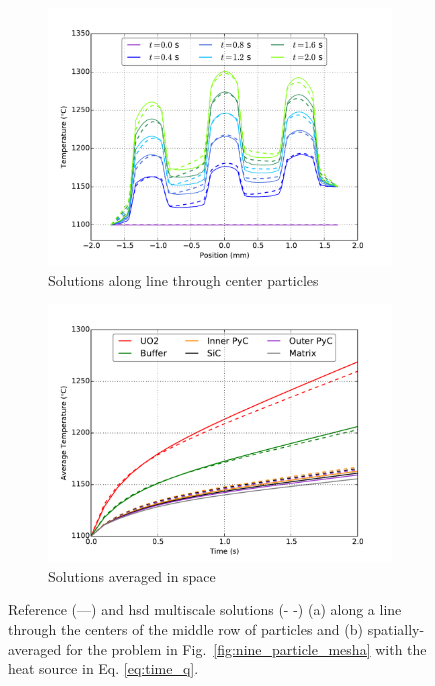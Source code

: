 \begin{figure}[!h]
\centering
\begin{subfigure}[b]{0.49\linewidth}
\centering
\includegraphics[width=1.1\linewidth]{figs/nine_particle_center_row_transient.png}
\caption{Solutions along line through center particles}
\label{fig:time_q}
\end{subfigure}
\begin{subfigure}[b]{0.49\linewidth}
\centering
\includegraphics[width=1.1\linewidth]{figs/nine_particle_transient_postprocessors.png}
\caption{Solutions averaged in space}
\label{fig:avg_nine}
\end{subfigure}
\caption{Reference (---) and \gls{hsd} multiscale solutions (- -) (a) along a line through the centers of the middle row of particles and (b) spatially-averaged for the problem in Fig.\ \ref{fig:nine_particle_mesha} with the heat source in Eq. \eqref{eq:time_q}.}
\end{figure}


